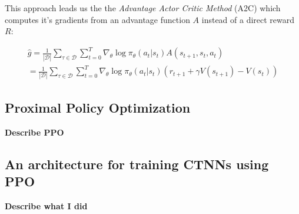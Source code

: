This approach leads us the the \textit{Advantage Actor Critic Method} (A2C) which computes it's gradients from an advantage function $A$ instead of a direct reward $R$:

\begin{align*}
    \hat{g} = \frac{1}{|\mathcal{D}|} \sum_{\tau \in \mathcal{D}} \sum_{t=0}^{T} \nabla_\theta \log \pi_\theta (a_t|s_t) A(s_{t+1},s_t,a_t)\\
    = \frac{1}{|\mathcal{D}|} \sum_{\tau \in \mathcal{D}} \sum_{t=0}^{T} \nabla_\theta \log \pi_\theta (a_t|s_t) (r_{t+1} + \gamma V(s_{t+1}) - V(s_t))
\end{align*}

\subsection{Proximal Policy Optimization}

\textbf{Describe PPO}

\subsection{An architecture for training CTNNs using PPO}

\textbf{Describe what I did}